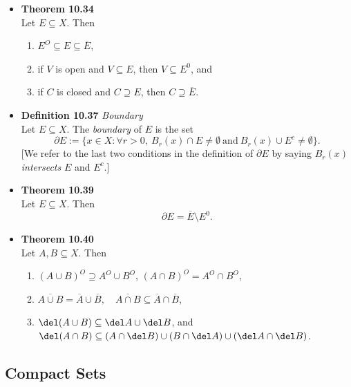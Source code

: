 \documentclass[11pt,a4paper]{article}
\begin{document}
\begin{itemize}
    \item \textbf{Theorem 10.34} \\
        Let $E \subseteq X$.
        Then
        \begin{enumerate}
            \item $E^O \subseteq E \subseteq \overline{E}$,
            \item if $V$ is open and $V \subseteq E$, then $V \subseteq E^0$, and
            \item if $C$ is closed and $C \supseteq E$, then $C \supseteq \overline{E}$.
        \end{enumerate}

    \item \textbf{Definition 10.37} \emph{Boundary} \\
        Let $E \subseteq X$.
        The \emph{boundary} of $E$ is the set
        \[
            \partial E := \{x \in X : \forall r > 0, \ B_r(x) \cap E \neq \emptyset \
            \text{and} \ B_r(x) \cup E^c \neq \emptyset \}.
        \]
        [We refer to the last two conditions in the definition of $\partial E$ by saying
        $B_r(x)$ \emph{intersects} $E$ and $E^c$.]

    \item \textbf{Theorem 10.39} \\
        Let $E \subseteq X$.
        Then
        \[
            \partial E = \overline{E} \setminus E^0.
        \]

    \item  \textbf{Theorem 10.40} \\
        Let $A, B \subseteq X$.
        Then
        \begin{enumerate}
            \item ${(A \cup B)}^O \supseteq A^O \cup B^O$, \quad
                ${(A \cap B)}^O = A^O \cap B^O$,
            \item $\overline{A \cup B} = \overline{A} \cup \overline{B}, \quad
                \overline{A \cap B} \subseteq \overline{A} \cap \overline{B}$,
            \item $\del (A \cup B) \subseteq \del A \cup \del B$, \quad and \quad
                $\del (A \cap B) \subseteq (A \cap \del B) \cup (B \cap \del A) \cup
                (\del A \cap \del B)$.
        \end{enumerate}
\end{itemize}

\subsection{Compact Sets}
\end{document}

